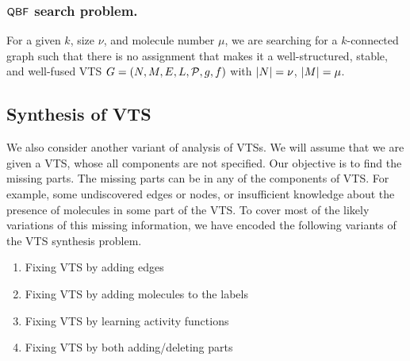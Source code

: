 \subsubsection{$\mathsf{QBF}$ search problem.} For a given $k$, size $\nu$, and molecule number $\mu$, we are searching for a $k$-connected graph such that there is no assignment that makes it a well-structured, stable, and well-fused VTS $G = (N,M,E,L,\mathcal{P},g,f)$ with $|N| = \nu$, $|M| = \mu$.    

%

\subsection{Synthesis of VTS}
%
\noindent We also consider another variant of analysis of VTSs.
%
We will assume that we are given a VTS, whose all components
are not specified.
%
Our objective is to find the missing parts.
%
The missing parts can be in any of the components of VTS. 
%
For example, some undiscovered edges or nodes, or insufficient
knowledge about the presence of molecules in some part of the VTS.
%
To cover most of the likely variations of this missing information,
we have encoded the following variants of the VTS synthesis problem.

\begin{enumerate}
	\item Fixing VTS by adding edges 
	\item Fixing VTS by adding molecules to the labels
	\item Fixing VTS by learning activity functions
	\item  Fixing VTS by both adding/deleting parts
\end{enumerate}

